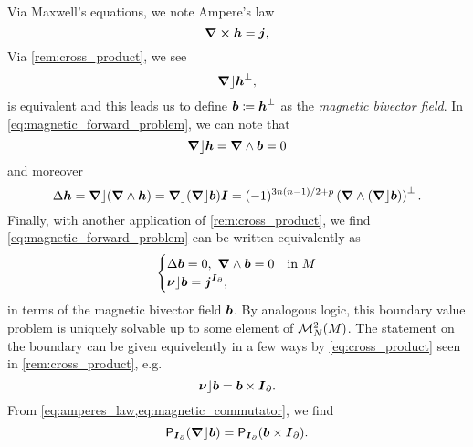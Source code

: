 Via Maxwell's equations, we note Ampere's law
\begin{equation}
\label{eq:amperes_law}
\boldsymbol{\nabla} \boldsymbol{\times} \boldsymbol{h} = \boldsymbol{j},
\end{equation}
Via \cref{rem:cross_product}, we see
\begin{equation}
\boldsymbol{\nabla} \rfloor \boldsymbol{h}^\perp,
\end{equation}
is equivalent and this leads us to define $\boldsymbol{b}\coloneqq \boldsymbol{h}^\perp$ as the \emph{magnetic bivector field}. In \cref{eq:magnetic_forward_problem}, we can note that
\begin{equation}
\boldsymbol{\nabla} \rfloor \boldsymbol{h} = \boldsymbol{\nabla} \wedge \boldsymbol{b} = 0
\end{equation}
and moreover
\begin{equation}
\Delta \boldsymbol{h} = \boldsymbol{\nabla} \rfloor (\boldsymbol{\nabla} \wedge \boldsymbol{h}) = \boldsymbol{\nabla} \rfloor (\boldsymbol{\nabla} \rfloor \boldsymbol{b})\boldsymbol{I} = (-1)^{3n(n-1)/2+p} \left(\boldsymbol{\nabla} \wedge (\boldsymbol{\nabla} \rfloor \boldsymbol{b})\right)^\perp.
\end{equation}
Finally, with another application of \cref{rem:cross_product}, we find \cref{eq:magnetic_forward_problem} can be written equivalently as
\begin{equation}
\label{eq:dirichlet_magnetic_bivector}
\begin{cases}
\Delta \boldsymbol{b} = 0, ~\boldsymbol{\nabla} \wedge \boldsymbol{b}=0 & \textrm{in $M$}\\
\boldsymbol{\nu} \rfloor \boldsymbol{b} = \boldsymbol{j}^{\boldsymbol{I}_\partial},
\end{cases}
\end{equation}
in terms of the magnetic bivector field $\boldsymbol{b}$. By analogous logic, this boundary value problem is uniquely solvable up to some element of $\mathcal{M}^{2}_N(M)$. The statement on the boundary can be given equivelently in a few ways by \cref{eq:cross_product} seen in \cref{rem:cross_product}, e.g.
\begin{equation}
\label{eq:magnetic_commutator}
\boldsymbol{\nu} \rfloor \boldsymbol{b} = \boldsymbol{b} \times \boldsymbol{I}_\partial.
\end{equation}
From \cref{eq:amperes_law,eq:magnetic_commutator}, we find
\begin{equation}
\mathsf{P}_{\boldsymbol{I}_\partial}(\boldsymbol{\nabla} \rfloor \boldsymbol{b}) = \mathsf{P}_{\boldsymbol{I}_\partial}(\boldsymbol{b} \times \boldsymbol{I}_\partial).
\end{equation}



